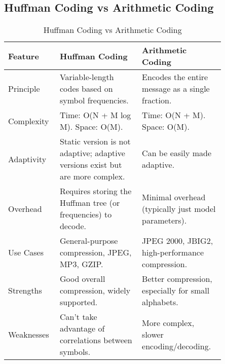 \subsection{Huffman Coding vs Arithmetic Coding}  
\begin{table}[H]  
    \centering  
    \renewcommand{\arraystretch}{1.5} %
    \setlength{\tabcolsep}{8pt} %
    \begin{tabular}{|p{0.15\linewidth}|p{0.35\linewidth}|p{0.35\linewidth}|}  
    \hline  
    \rowcolor{gray!30}  
        \textbf{Feature} & \textbf{Huffman Coding} & \textbf{Arithmetic Coding}\\\hline  
        Principle & Variable-length codes based on symbol frequencies. & Encodes the entire message as a single fraction.\\\hline  
        Complexity & Time:   O(N + M log M). \newline Space: O(M). & Time: O(N + M). \newline Space: O(M).\\\hline  
        Adaptivity & Static version is not adaptive; adaptive versions exist but are more complex. & Can be easily made adaptive. \\\hline  
        Overhead & Requires storing the Huffman tree (or frequencies) to decode. & Minimal overhead (typically just model parameters).\\\hline  
        Use Cases & General-purpose compression, JPEG, MP3, GZIP. & JPEG 2000, JBIG2, high-performance compression.\\\hline  
        Strengths & Good overall compression, widely supported. & Better compression, especially for small alphabets.\\\hline  
        Weaknesses & Can’t take advantage of correlations between symbols. & More complex, slower encoding/decoding.\\\hline  
    \end{tabular}  
    \caption{Huffman Coding vs Arithmetic Coding}  
    \label{tab:Huffman_vs_Arithmetic}  
\end{table}  

